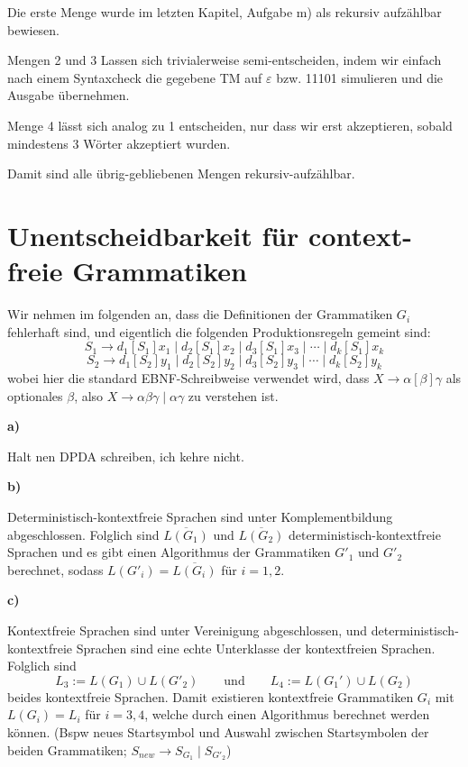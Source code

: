 \documentclass[a4paper,graphics,11pt]{article}
\newcommand{\eps}[0]{\varepsilon}
\begin{document}
Die erste Menge wurde im letzten Kapitel, Aufgabe m) als rekursiv aufzählbar bewiesen.

Mengen 2 und 3 Lassen sich trivialerweise semi-entscheiden, indem wir einfach nach einem Syntaxcheck
die gegebene TM auf $\eps$ bzw. 11101 simulieren und die Ausgabe übernehmen.

Menge 4 lässt sich analog zu 1 entscheiden, nur dass wir erst akzeptieren, sobald mindestens 3 Wörter
akzeptiert wurden.

Damit sind alle übrig-gebliebenen Mengen rekursiv-aufzählbar.

\newpage

\section{Unentscheidbarkeit für context-freie Grammatiken}

Wir nehmen im folgenden an, dass die Definitionen der Grammatiken $G_i$ fehlerhaft sind, und eigentlich die folgenden
Produktionsregeln gemeint sind:
$$
    S_1 \to d_1[S_1]x_1 \mid d_2[S_1]x_2 \mid d_3[S_1]x_3 \mid \cdots \mid d_k[S_1]x_k
$$$$
    S_2 \to d_1[S_2]y_1 \mid d_2[S_2]y_2 \mid d_3[S_2]y_3 \mid \cdots \mid d_k[S_2]y_k
$$
wobei hier die standard EBNF-Schreibweise verwendet wird, dass $X \to \alpha[\beta]\gamma$ als optionales
$\beta$, also $X \to \alpha\beta\gamma \mid \alpha\gamma$ zu verstehen ist.

\textbf{a)}

Halt nen DPDA schreiben, ich kehre nicht.

\strut

\textbf{b)}

Deterministisch-kontextfreie Sprachen sind unter Komplementbildung abgeschlossen. Folglich sind
$\overline{L(G_1)}$ und $\overline{L(G_2)}$ deterministisch-kontextfreie Sprachen und es gibt einen Algorithmus
der Grammatiken $G'_1$ und $G'_2$ berechnet, sodass $L(G'_i) = \overline{L(G_i)}$ für $i=1,2$.

\strut

\textbf{c)}

Kontextfreie Sprachen sind unter Vereinigung abgeschlossen, und deterministisch-kontextfreie Sprachen sind eine
echte Unterklasse der kontextfreien Sprachen. Folglich sind
$$
    L_3 := L(G_1) \cup L(G'_2)
    \qquad\text{und}\qquad
    L_4 := L(G_1') \cup L(G_2)
$$
beides kontextfreie Sprachen. Damit existieren kontextfreie Grammatiken $G_i$ mit $L(G_i) = L_i$ für $i=3,4$,
welche durch einen Algorithmus berechnet werden können. (Bspw neues Startsymbol und Auswahl zwischen
Startsymbolen der beiden Grammatiken; $S_{new} \to S_{G_1} \mid S_{G'_2}$)
\end{document}
